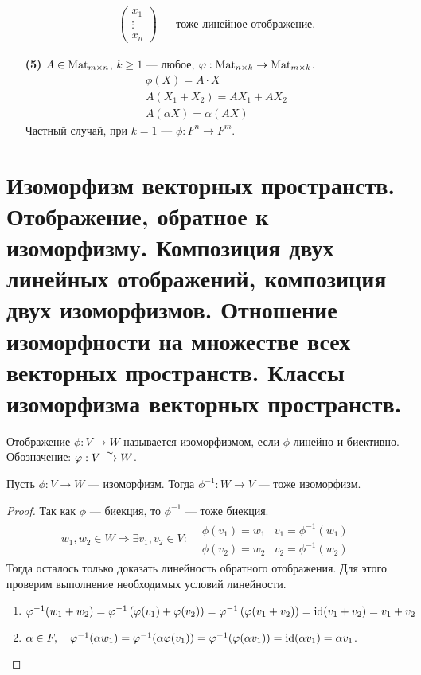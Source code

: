 \begin{itemize}
\begin{gather*}
\begin{pmatrix*}
x_1 \\
\vdots \\
x_n
\end{pmatrix*} \text{ --- тоже линейное отображение.}
\end{gather*}
\item[\textbf{(5)}] $A \in \mathrm{Mat}_{m\times n}$, $k \geqslant 1$ --- любое, $\varphi: \mathrm{Mat}_{n\times k} \rightarrow \mathrm{Mat}_{m\times k}$.
\begin{gather*}
\phi(X) = A \cdot X \\
A(X_1 + X_2) = AX_1 + AX_2 \\
A(\alpha X) = \alpha(AX) 
\end{gather*}
Частный случай, при $k = 1$ --- $\phi: F^n \rightarrow F^m$.
\end{itemize}

\section{Изоморфизм векторных пространств. Отображение, обратное к изоморфизму. Композиция двух линейных отображений, композиция двух изоморфизмов. Отношение изоморфности на множестве всех векторных пространств. Классы изоморфизма векторных пространств.}

\begin{Def}
Отображение $\phi: V \rightarrow W$ называется изоморфизмом, если $\phi$ линейно и биективно. Обозначение: $\varphi : V \xrightarrow{\sim}  W$.
\end{Def}

\begin{Suggestion}
Пусть $\phi: V \rightarrow W$ --- изоморфизм. Тогда $\phi^{-1}: W \rightarrow V$ --- тоже изоморфизм.
\end{Suggestion}
\begin{proof}
Так как $\phi$ --- биекция, то $\phi^{-1}$ --- тоже биекция.
\begin{gather*}
w_1, w_2 \in W \Rightarrow \exists v_1, v_2 \in V:
\begin{aligned} 
&\phi(v_1) = w_1 & v_1 = \phi^{-1}(w_1)\\ 
&\phi(v_2) = w_2 & v_2 = \phi^{-1}(w_2)
\end{aligned} 
\end{gather*}
Тогда осталось только доказать линейность обратного отображения. Для этого проверим выполнение необходимых условий линейности.
\begin{enumerate}
\item $ \varphi^{-1}(w_1 + w_2) = \varphi^{-1}\left(\varphi(v_1) + \varphi(v_2)\right) = \varphi^{-1}\left(\varphi(v_1 + v_2)\right) = \mathrm{id} (v_1 + v_2) = v_1 + v_2$
\item $\alpha \in F, \quad \varphi^{-1}(\alpha w_1) = \varphi^{-1}(\alpha\varphi(v_1)) = \varphi^{-1}(\varphi(\alpha v_1)) = \mathrm{id} (\alpha v_1) = \alpha v_1$.
\end{enumerate}
\end{proof}


